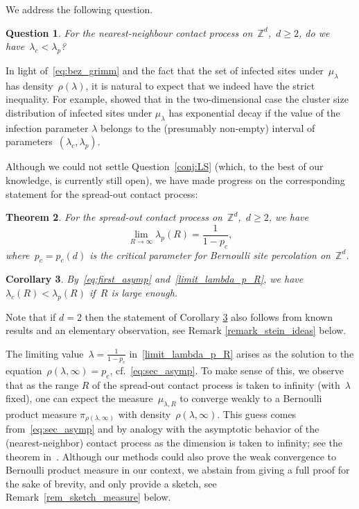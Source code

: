 \documentclass[a4paper,12pt]{article}
\newtheorem  {theorem}       {Theorem}[section]
\newtheorem  {corollary}     [theorem]{Corollary}
\newtheorem  {question}        [theorem]{Question}
\newcommand{\Z}{\mathbb{Z}}
\begin{document}
\smallskip


We address the following question.
\begin{question}\textup{\cite[Section 6, Question 2]{LS06} \label{conj:LS}}
	For the nearest-neighbour contact process on~$\Z^d$,~$d \ge 2$, do we have~$\lambda_c  < \lambda_p$?
\end{question}
In light of~\eqref{eq:bez_grimm} and the fact that the set of infected sites under~$\mu_\lambda$ has density~$\rho(\lambda)$, it is natural to expect that we indeed have the strict inequality. For example,  \cite{rob_sharp} showed that in the two-dimensional case the cluster size distribution of infected sites under $\mu_\lambda$ has exponential decay if the value of the infection parameter $\lambda$  belongs to the (presumably non-empty) interval of parameters~$(\lambda_c,\lambda_p)$.


\smallskip


 Although we could not settle Question~\ref{conj:LS} (which, to the best of our knowledge, is currently still open), we have made progress on the corresponding statement for the spread-out contact process:

\begin{theorem}\label{thm_main} For the spread-out contact process on~$\Z^d$,~$d \ge 2$, we have
	\begin{equation}\label{limit_lambda_p_R}
	\lim_{R \to \infty} \lambda_{p}(R) = \frac{1}{1-p_c},
	\end{equation}
where~$p_c=p_c(d)$ is the critical parameter for Bernoulli site percolation on~$\Z^d$.
\end{theorem}
\begin{corollary}\label{corollary_l_c_l_p_different}
By~\eqref{eq:first_asymp} and~\eqref{limit_lambda_p_R}, we have~$\lambda_c(R) < \lambda_p(R)$ if~$R$ is large enough.
\end{corollary}
Note that if $d=2$ then the statement of Corollary \ref{corollary_l_c_l_p_different} also follows from known results
and an elementary observation, see Remark \ref{remark_stein_ideas} below.

\smallskip


The limiting value~$\lambda = \frac{1}{1-p_c}$ in~\eqref{limit_lambda_p_R} arises as the solution to the equation~$\rho(\lambda,\infty) = p_c$, cf.\ \eqref{eq:sec_asymp}. To make sense of this, we observe that as the range $R$ of the spread-out contact process is taken to infinity (with~$\lambda$ fixed), one can expect the measure~$\mu_{\lambda,R}$ to converge weakly to a Bernoulli product measure $\pi_{\rho(\lambda, \infty)}$ with density~$\rho(\lambda, \infty)$. This guess comes from~\eqref{eq:sec_asymp} and by analogy with the asymptotic behavior of the (nearest-neighbor) contact process as the dimension is taken to infinity; see the theorem in~\cite[page~388]{SV86}. Although our methods could also prove the weak convergence to Bernoulli product measure in our context, we abstain from giving a full proof for the sake of brevity, and only provide a sketch, see Remark~\ref{rem_sketch_measure} below.
\end{document}
